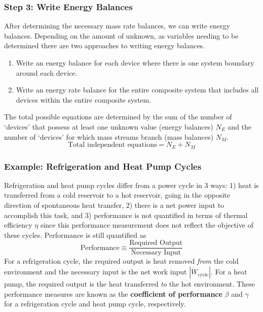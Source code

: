 \documentclass{article}
\begin{document}
\subsubsection{Step 3: Write Energy Balances}

After determining the necessary mass rate balances, we can write energy balances.  Depending on the amount of unknown, as variables needing to be determined there are two approaches to writing energy balances.
\begin{enumerate}
    \item Write an energy balance for each device where there is one system boundary around each device.
    \item Write an energy rate balance for the entire composite system that includes all devices within the entire composite system.
\end{enumerate}

The total possible equations are determined by the sum of the number of `devices' that possess at least one unknown value (energy balances) $N_E$ and the number of `devices' for which mass streams branch (mass balances) $N_M$.
\begin{equation}
\text{Total independent equations} = N_E + N_M
\end{equation}

\subsubsection{Example: Refrigeration and Heat Pump Cycles}
Refrigeration and heat pump cycles differ from a power cycle in $3$ ways: 1) heat is transferred from a cold reservoir to a hot reservoir, going in the opposite direction of spontaneous heat transfer, 2) there is a net power input to accomplish this task, and 3) performance is not quantified in terms of thermal efficiency $\eta$ since this performance measurement does not reflect the objective of these cycles. Performance is still quantified as
\begin{equation}\label{eq:performance}
\text{Performance} \equiv \frac{\textrm{Required Output}}{\textrm{Necessary Input}}
\end{equation}
For a refrigeration cycle, the required output is heat removed \emph{from} the cold environment and the necessary input is the net work input $|\dot{W}_{\text{cycle}}|$. For a heat pump, the required output is the heat transferred \emph{to} the hot environment. These performance measures are known as the \textbf{coefficient of performance} $\beta$ and $\gamma$ for a refrigeration cycle and heat pump cycle, respectively. 
\end{document}
